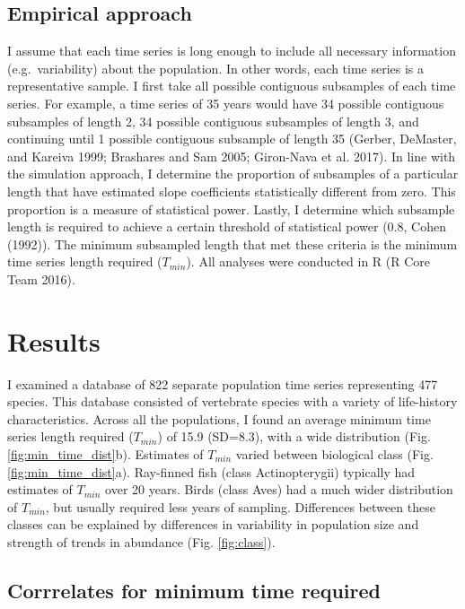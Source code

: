 \documentclass[12pt,]{article}
\begin{document}
\subsection{Empirical approach}\label{empirical-approach}

I assume that each time series is long enough to include all necessary
information (e.g.~variability) about the population. In other words,
each time series is a representative sample. I first take all possible
contiguous subsamples of each time series. For example, a time series of
35 years would have 34 possible contiguous subsamples of length 2, 34
possible contiguous subsamples of length 3, and continuing until 1
possible contiguous subsample of length 35 (Gerber, DeMaster, and
Kareiva 1999; Brashares and Sam 2005; Giron-Nava et al. 2017). In line
with the simulation approach, I determine the proportion of subsamples
of a particular length that have estimated slope coefficients
statistically different from zero. This proportion is a measure of
statistical power. Lastly, I determine which subsample length is
required to achieve a certain threshold of statistical power (0.8, Cohen
(1992)). The minimum subsampled length that met these criteria is the
minimum time series length required (\(T_{min}\)). All analyses were
conducted in R (R Core Team 2016).

\section{Results}\label{results}

I examined a database of 822 separate population time series
representing 477 species. This database consisted of vertebrate species
with a variety of life-history characteristics. Across all the
populations, I found an average minimum time series length required
(\(T_{min}\)) of 15.9 (SD=8.3), with a wide distribution (Fig.
\ref{fig:min_time_dist}b). Estimates of \(T_{min}\) varied between
biological class (Fig. \ref{fig:min_time_dist}a). Ray-finned fish (class
Actinopterygii) typically had estimates of \(T_{min}\) over 20 years.
Birds (class Aves) had a much wider distribution of \(T_{min}\), but
usually required less years of sampling. Differences between these
classes can be explained by differences in variability in population
size and strength of trends in abundance (Fig. \ref{fig:class}).

\subsection{Corrrelates for minimum time
required}\label{corrrelates-for-minimum-time-required}
\end{document}
